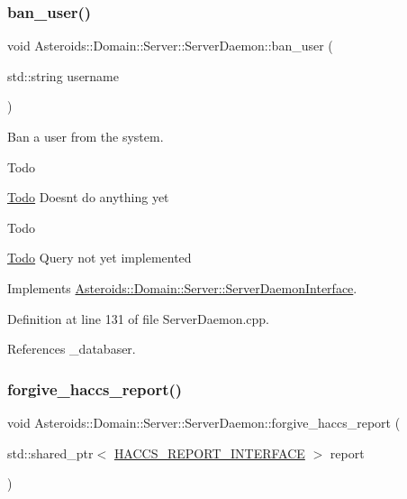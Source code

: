 \subsubsection{\texorpdfstring{ban\+\_\+user()}{ban\_user()}}
{\footnotesize\ttfamily void Asteroids\+::\+Domain\+::\+Server\+::\+Server\+Daemon\+::ban\+\_\+user (\begin{DoxyParamCaption}\item[{std\+::string}]{username }\end{DoxyParamCaption})\hspace{0.3cm}{\ttfamily [virtual]}}



Ban a user from the system. 

\begin{DoxyRefDesc}{Todo}
\item[\hyperlink{todo__todo000012}{Todo}]Doesn\textquotesingle{}t do anything yet \end{DoxyRefDesc}
\begin{DoxyRefDesc}{Todo}
\item[\hyperlink{todo__todo000013}{Todo}]Query not yet implemented \end{DoxyRefDesc}


Implements \hyperlink{classAsteroids_1_1Domain_1_1Server_1_1ServerDaemonInterface_a1c2a40f1a8d8f877ca239aaaf5b0a573}{Asteroids\+::\+Domain\+::\+Server\+::\+Server\+Daemon\+Interface}.



Definition at line 131 of file Server\+Daemon.\+cpp.



References \+\_\+databaser.

\mbox{\label{classAsteroids_1_1Domain_1_1Server_1_1ServerDaemon_a0db3978640446e783c54932014d043cb}} 
\subsubsection{\texorpdfstring{forgive\+\_\+haccs\+\_\+report()}{forgive\_haccs\_report()}}
{\footnotesize\ttfamily void Asteroids\+::\+Domain\+::\+Server\+::\+Server\+Daemon\+::forgive\+\_\+haccs\+\_\+report (\begin{DoxyParamCaption}\item[{std\+::shared\+\_\+ptr$<$ \hyperlink{classAsteroids_1_1Domain_1_1Server_1_1HACCS__REPORT__INTERFACE}{H\+A\+C\+C\+S\+\_\+\+R\+E\+P\+O\+R\+T\+\_\+\+I\+N\+T\+E\+R\+F\+A\+CE} $>$}]{report }\end{DoxyParamCaption})\hspace{0.3cm}{\ttfamily [virtual]}}



